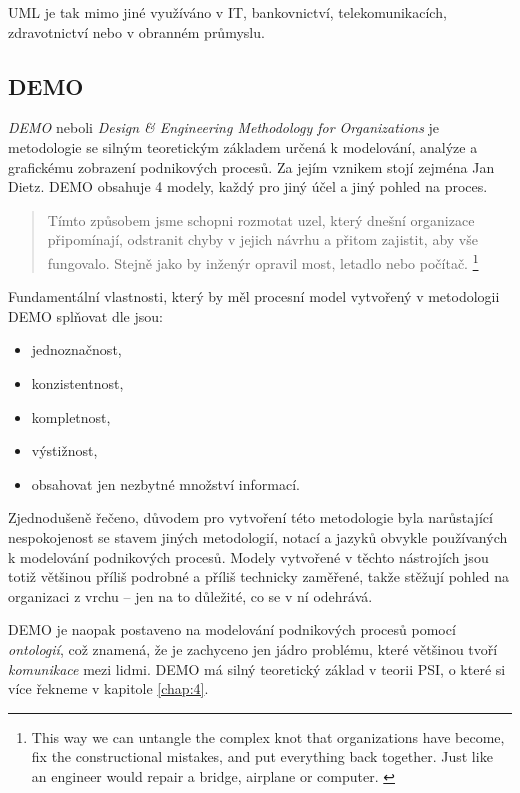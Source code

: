 UML je tak mimo jiné využíváno v IT, bankovnictví, telekomunikacích, zdravotnictví nebo v obranném průmyslu.

\subsection{DEMO}
\textit{DEMO} neboli \textit{Design \& Engineering Methodology for Organizations} je metodologie se silným teoretickým základem určená k modelování, analýze a grafickému zobrazení podnikových procesů. Za jejím vznikem stojí zejména Jan Dietz. DEMO obsahuje 4 modely, každý pro jiný účel a jiný pohled na proces.

\begin{quote}
Tímto způsobem jsme schopni rozmotat uzel,  který dnešní organizace připomínají, odstranit chyby v jejich návrhu a přitom zajistit, aby vše fungovalo. Stejně jako by inženýr opravil most, letadlo nebo počítač. \cite{DEMO_web}
\footnote{This way we can untangle the complex knot that organizations have become, fix the constructional mistakes, and put everything back together. Just like an engineer would repair a bridge, airplane or computer. \cite{DEMO_web}}
\end{quote}

Fundamentální vlastnosti, který by měl procesní model vytvořený v metodologii DEMO splňovat dle \cite{Dietz2006} jsou:

\begin{itemize}
\item jednoznačnost,
\item konzistentnost,
\item kompletnost,
\item výstižnost,
\item obsahovat jen nezbytné množství informací.
\end{itemize}

Zjednodušeně řečeno, důvodem pro vytvoření této metodologie byla narůstající nespokojenost se stavem jiných metodologií, notací a jazyků obvykle používaných k modelování podnikových procesů. 
Modely vytvořené v těchto nástrojích jsou totiž většinou příliš podrobné a příliš technicky zaměřené, takže stěžují pohled na organizaci z vrchu – jen na to důležité, co se v ní odehrává.

DEMO je naopak postaveno na modelování podnikových procesů pomocí \textit{ontologií}, což znamená, že je zachyceno jen jádro problému, které většinou tvoří \textit{komunikace} mezi lidmi. DEMO má silný teoretický základ v teorii PSI, o které si více řekneme v kapitole \ref{chap:4}.

